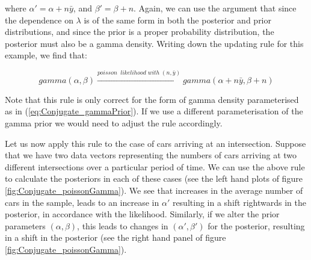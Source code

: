 \documentclass[11pt,fullpage]{book}
\begin{document}
where $\alpha' = \alpha + n \bar{y}$, and $\beta' = \beta + n$. Again, we can use the argument that since the dependence on $\lambda$ is of the same form in both the posterior and prior distributions, and since the prior is a proper probability distribution, the posterior must also be a gamma density. Writing down the updating rule for this example, we find that:

\begin{equation}
gamma(\alpha,\beta)\xrightarrow{poisson\;\; likelihood\; with\; (n, \bar{y})} gamma(\alpha + n \bar{y}, \beta + n)
\end{equation}

Note that this rule is only correct for the form of gamma density parameterised as in (\ref{eq:Conjugate_gammaPrior}). If we use a different parameterisation of the gamma prior we would need to adjust the rule accordingly.

Let us now apply this rule to the case of cars arriving at an intersection. Suppose that we have two data vectors representing the numbers of cars arriving at two different intersections over a particular period of time. We can use the above rule to calculate the posteriors in each of these cases (see the left hand plots of figure \ref{fig:Conjugate_poissonGamma}). We see that increases in the average number of cars in the sample, leads to an increase in $\alpha'$ resulting in a shift rightwards in the posterior, in accordance with the likelihood. Similarly, if we alter the prior parameters $(\alpha,\beta)$, this leads to changes in $(\alpha',\beta')$ for the posterior, resulting in a shift in the posterior (see the right hand panel of figure \ref{fig:Conjugate_poissonGamma}).
\end{document}
